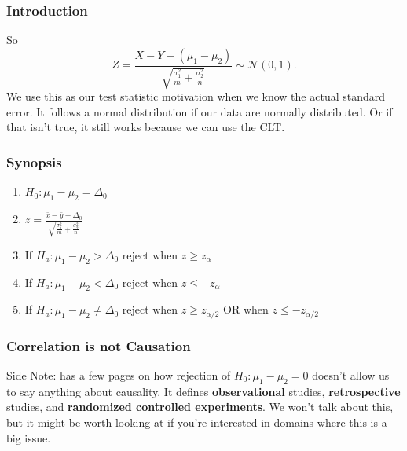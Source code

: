 \documentclass{beamer}
\begin{document}
\begin{frame}
\frametitle{Introduction}

So 
\[
Z = \frac{\bar{X} - \bar{Y} - (\mu_1 - \mu_2)}{\sqrt{\frac{\sigma_1^2}{m}+\frac{\sigma_2^2}{n} } } \sim \mathcal{N}(0, 1).
\]
We use this as our test statistic motivation when we know the actual standard error. It follows a normal distribution if our data are normally distributed. Or if that isn't true, it still works because we can use the CLT.




\end{frame}
\begin{frame}
\frametitle{Synopsis}

\begin{enumerate}
\item $H_0: \mu_1 - \mu_2 = \Delta_0$
\item $z = \frac{\bar{x} - \bar{y} - \Delta_0}{\sqrt{\frac{\sigma_1^2}{m}+\frac{\sigma_2^2}{n} } }$
\item If $H_a: \mu_1 - \mu_2 > \Delta_0$ reject when $z \ge z_{\alpha}$
\item If $H_a: \mu_1 - \mu_2 < \Delta_0$ reject when $z \le -z_{\alpha}$
\item If $H_a: \mu_1 - \mu_2 \neq \Delta_0$ reject when $z \ge z_{\alpha/2}$ OR when $z \le -z_{\alpha/2}$
\end{enumerate}

\end{frame}
\begin{frame}
\frametitle{Correlation is not Causation}

Side Note: has a few pages on how rejection of $H_0: \mu_1 - \mu_2 = 0$ doesn't allow us to say anything about causality. It defines \textbf{observational} studies, \textbf{retrospective} studies, and \textbf{randomized controlled experiments}. We won't talk about this, but it might be worth looking at if you're interested in domains where this is a big issue.

\end{frame}
\end{document}
